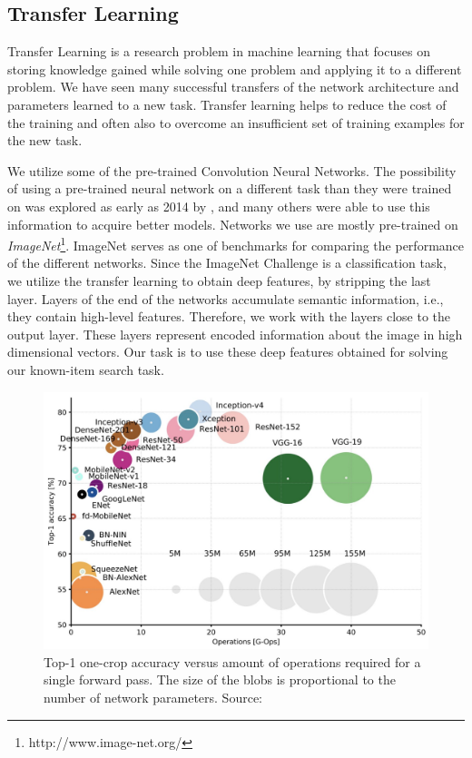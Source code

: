 
\subsection{Transfer Learning}

Transfer Learning is a research problem in machine learning that focuses on storing knowledge gained while solving one problem and applying it to a different problem. We have seen many successful transfers of the network architecture and parameters learned to a new task. Transfer learning helps to reduce the cost of the training and often also to overcome an insufficient set of training examples for the new task.

We utilize some of the pre-trained Convolution Neural Networks. The possibility of using a pre-trained neural network on a different task than they were trained on was explored as early as 2014 by \cite{donahuedeep}, and many others were able to use this information to acquire better models.  Networks we use are mostly pre-trained on \emph{ImageNet}\footnote{http://www.image-net.org/}. ImageNet serves as one of benchmarks for comparing the performance of the different networks. Since the ImageNet Challenge is a classification task, we utilize the transfer learning to obtain deep features, by stripping the last layer. Layers of the end of the networks accumulate semantic information, i.e., they contain high-level features. Therefore, we work with the layers close to the output layer. These layers represent encoded information about the image in high dimensional vectors. Our task is to use these deep features obtained for solving our known-item search task.

\begin{figure}
    \centering
	\includegraphics[width=0.8\linewidth]{img/network-comparison.jpeg}
	\caption{Top-1 one-crop accuracy versus amount of operations required for a single forward pass. The size of the blobs is proportional to the number of network parameters. Source: \cite{canziani2016analysis}}
	\label{fig:camera-setup}
\end{figure}

